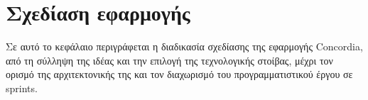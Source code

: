 \chapter{Σχεδίαση εφαρμογής}\label{chapter:3-application-design}

Σε αυτό το κεφάλαιο περιγράφεται η διαδικασία σχεδίασης της εφαρμογής Concordia, από τη σύλληψη της ιδέας και την επιλογή της τεχνολογικής στοίβας, μέχρι τον ορισμό της αρχιτεκτονικής της και τον διαχωρισμό του προγραμματιστικού έργου σε sprints. 










